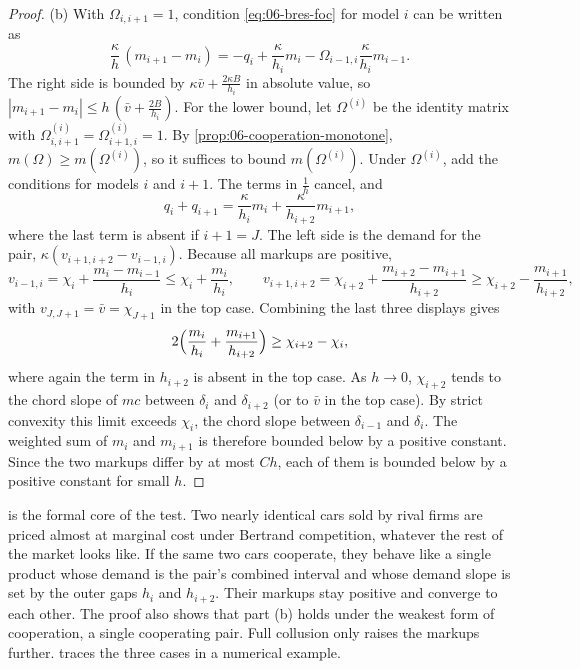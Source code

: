 \begin{proof}
(b) With $\Omega_{i,i+1} = 1$, condition \eqref{eq:06-bres-foc} for model $i$ can be written as
\begin{equation*}
  \frac{\kappa}{h}\,(m_{i+1} - m_i) = -q_i + \frac{\kappa}{h_i}m_i - \Omega_{i-1,i}\frac{\kappa}{h_i}m_{i-1} .
\end{equation*}
The right side is bounded by $\kappa\bar v + \frac{2\kappa B}{h_i}$ in absolute value, so
$|m_{i+1} - m_i| \le h\,(\bar v + \frac{2B}{h_i})$. For the lower bound, let $\Omega^{(i)}$ be the identity matrix with
$\Omega^{(i)}_{i,i+1} = \Omega^{(i)}_{i+1,i} = 1$. By \cref{prop:06-cooperation-monotone}, $m(\Omega) \ge m(\Omega^{(i)})$,
so it suffices to bound $m(\Omega^{(i)})$. Under $\Omega^{(i)}$, add the conditions for models $i$ and $i+1$. The
terms in $\frac{1}{h}$ cancel, and
\begin{equation*}
  q_i + q_{i+1} = \frac{\kappa}{h_i}m_i + \frac{\kappa}{h_{i+2}}m_{i+1},
\end{equation*}
where the last term is absent if $i + 1 = J$. The left side is the demand for the pair,
$\kappa(v_{i+1,i+2} - v_{i-1,i})$. Because all markups are positive,
\begin{equation*}
  v_{i-1,i} = \chi_i + \frac{m_i - m_{i-1}}{h_i} \le \chi_i + \frac{m_i}{h_i},
  \qquad
  v_{i+1,i+2} = \chi_{i+2} + \frac{m_{i+2} - m_{i+1}}{h_{i+2}} \ge \chi_{i+2} - \frac{m_{i+1}}{h_{i+2}},
\end{equation*}
with $v_{J,J+1} = \bar v = \chi_{J+1}$ in the top case. Combining the last three displays gives
\begin{equation*}
  2\Bigl(\frac{m_i}{h_i} + \frac{m_{i+1}}{h_{i+2}}\Bigr) \ge \chi_{i+2} - \chi_i ,
\end{equation*}
where again the term in $h_{i+2}$ is absent in the top case.
As $h \to 0$, $\chi_{i+2}$ tends to the chord slope of $mc$ between $\delta_i$ and $\delta_{i+2}$ (or to $\bar v$ in
the top case). By strict convexity this limit exceeds $\chi_i$, the chord slope between $\delta_{i-1}$ and $\delta_i$.
The weighted sum of $m_i$ and $m_{i+1}$ is therefore bounded below by a positive constant. Since the two markups
differ by at most $C h$, each of them is bounded below by a positive constant for small $h$.
\end{proof}

 is the formal core of the test. Two nearly identical cars sold by rival firms are
priced almost at marginal cost under Bertrand competition, whatever the rest of the market looks like. If the same
two cars cooperate, they behave like a single product whose demand is the pair's combined interval and whose demand
slope is set by the outer gaps $h_i$ and $h_{i+2}$. Their markups stay positive and converge to each other. The
proof also shows that part (b) holds under the weakest form of cooperation, a single cooperating pair. Full collusion
only raises the markups further.  traces the three cases in a numerical example.


